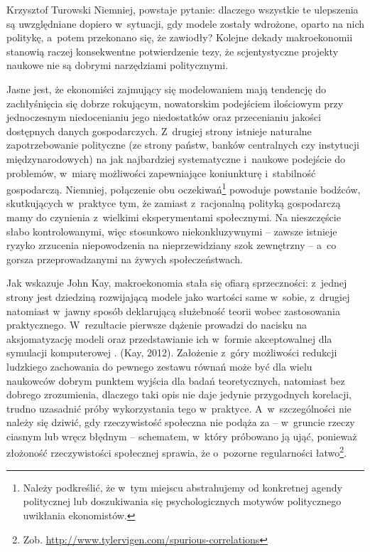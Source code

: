 \begin{artplenv}{Krzysztof Turowski}
Niemniej, powstaje pytanie: dlaczego wszystkie te ulepszenia są uwzględniane dopiero w~sytuacji, gdy modele zostały
wdrożone, oparto na nich politykę, a~potem przekonano się, że zawiodły? Kolejne dekady makroekonomii stanowią raczej
konsekwentne potwierdzenie tezy, że scjentystyczne projekty naukowe nie są dobrymi narzędziami politycznymi.

Jasne jest, że ekonomiści zajmujący się modelowaniem mają tendencję do zachłyśnięcia się dobrze rokującym, nowatorskim
podejściem ilościowym przy jednoczesnym niedocenianiu jego niedostatków oraz przecenianiu jakości dostępnych danych
gospodarczych. Z~drugiej strony istnieje naturalne zapotrzebowanie polityczne (ze strony państw, banków centralnych czy
instytucji międzynarodowych) na jak najbardziej systematyczne i~naukowe podejście do problemów, w~miarę możliwości
zapewniające koniunkturę i~stabilność gospodarczą. Niemniej, połączenie obu oczekiwań\footnote{Należy podkreślić,
że w~tym miejscu abstrahujemy od konkretnej agendy politycznej lub doszukiwania się psychologicznych motywów politycznego
uwikłania ekonomistów.} powoduje powstanie bodźców, skutkujących w~praktyce tym, że zamiast z~racjonalną polityką
gospodarczą mamy do czynienia z~wielkimi eksperymentami społecznymi. Na nieszczęście słabo kontrolowanymi, więc
stosunkowo niekonkluzywnymi  --  zawsze istnieje ryzyko zrzucenia niepowodzenia na nieprzewidziany szok
zewnętrzny  --  a~co gorsza przeprowadzanymi na żywych społeczeństwach.

Jak wskazuje John Kay, makroekonomia stała się ofiarą sprzeczności: z~jednej strony jest dziedziną rozwijającą modele
jako wartości same w~sobie, z~drugiej natomiast w~jawny sposób deklarującą służebność teorii wobec zastosowania
praktycznego. W~rezultacie pierwsze dążenie prowadzi do nacisku na aksjomatyzację modeli oraz przedstawianie
ich w~formie akceptowalnej dla symulacji komputerowej
\parencite{kay_map_2012}.
\label{ref:RNDcWSYLEcSGp}(Kay, 2012).
Założenie z~góry możliwości
redukcji ludzkiego zachowania do pewnego zestawu równań może być dla wielu naukowców dobrym punktem wyjścia dla badań
teoretycznych, natomiast bez dobrego zrozumienia, dlaczego taki opis nie daje jedynie przygodnych korelacji, trudno
uzasadnić próby wykorzystania tego w~praktyce. A~w~szczególności nie należy się dziwić, gdy rzeczywistość społeczna nie
podąża za  --  w~gruncie rzeczy ciasnym lub wręcz błędnym  --  schematem, w~który próbowano ją ująć,
ponieważ złożoność rzeczywistości społecznej sprawia, że o~pozorne regularności łatwo\footnote{Zob.
\url{http://www.tylervigen.com/spurious-correlations}}.


\end{artplenv}
